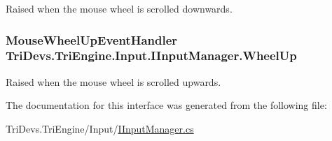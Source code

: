 Raised when the mouse wheel is scrolled downwards. 

\hypertarget{interface_tri_devs_1_1_tri_engine_1_1_input_1_1_i_input_manager_a7ff29af67407f381c5d7e23ced4c2b21}{
\subsubsection[{Wheel\-Up}]{\setlength{\rightskip}{0pt plus 5cm}Mouse\-Wheel\-Up\-Event\-Handler Tri\-Devs.\-Tri\-Engine.\-Input.\-I\-Input\-Manager.\-Wheel\-Up}}\label{interface_tri_devs_1_1_tri_engine_1_1_input_1_1_i_input_manager_a7ff29af67407f381c5d7e23ced4c2b21}


Raised when the mouse wheel is scrolled upwards. 



The documentation for this interface was generated from the following file\-:\begin{DoxyCompactItemize}
\item 
Tri\-Devs.\-Tri\-Engine/\-Input/\hyperlink{_i_input_manager_8cs}{I\-Input\-Manager.\-cs}\end{DoxyCompactItemize}
